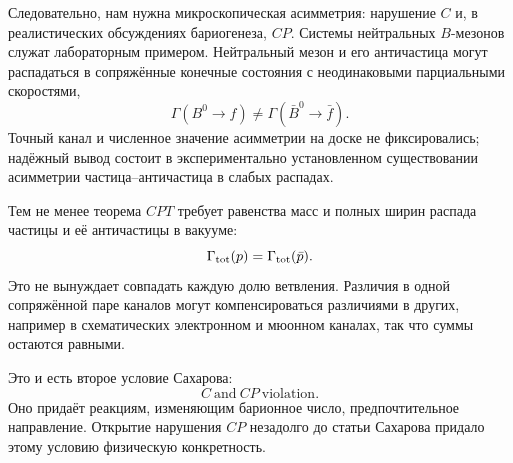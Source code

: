 \begin{classroomqa}
\end{classroomqa}

Следовательно, нам нужна микроскопическая асимметрия: нарушение \(C\) и, в реалистических обсуждениях бариогенеза, \(CP\). Системы нейтральных \(B\)-мезонов служат лабораторным примером. Нейтральный мезон и его античастица могут распадаться в сопряжённые конечные состояния с неодинаковыми парциальными скоростями,
\begin{equation}
\Gamma(B^0\to f)\ne\Gamma(\bar B^0\to\bar f).
\label{eq:c08-cp-partial}
\end{equation}
Точный канал и численное значение асимметрии на доске не фиксировались; надёжный вывод состоит в экспериментально установленном существовании асимметрии частица--античастица в слабых распадах.

Тем не менее теорема \(CPT\) требует равенства масс и полных ширин распада частицы и её античастицы в вакууме:
\begin{equation}
\Gamma_{\rm tot}(p)=\Gamma_{\rm tot}(\bar p).
\end{equation}
Это не вынуждает совпадать каждую долю ветвления. Различия в одной сопряжённой паре каналов могут компенсироваться различиями в других, например в схематических электронном и мюонном каналах, так что суммы остаются равными.

\begin{classroomqa}
\end{classroomqa}

Это и есть второе условие Сахарова:
\begin{equation}
\boxed{C\ \text{and}\ CP\ \text{violation}.}
\end{equation}
Оно придаёт реакциям, изменяющим барионное число, предпочтительное направление. Открытие нарушения \(CP\) незадолго до статьи Сахарова придало этому условию физическую конкретность.


